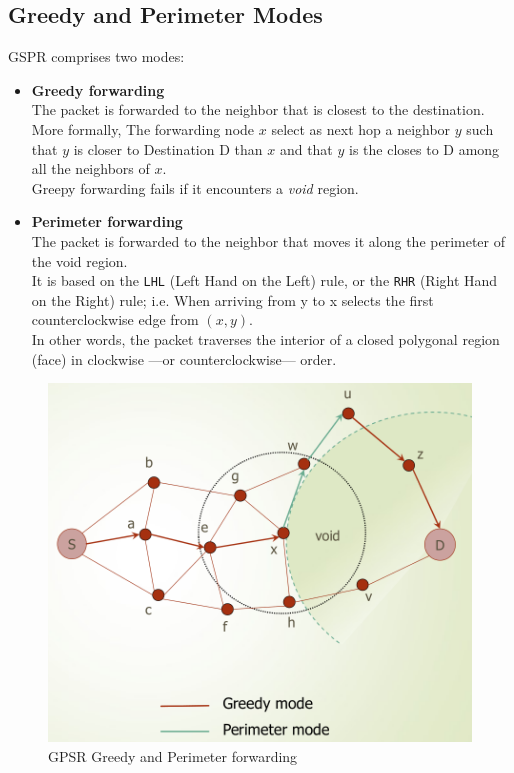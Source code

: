 \subsection{Greedy and Perimeter Modes}
\begin{paracol}{2}
   
   GSPR comprises two modes:
   \begin{itemize}
      \item \textbf{Greedy forwarding}\\
      The packet is forwarded to the neighbor that is closest to the destination.\\
      More formally,
      The forwarding node $x$ select as next hop a neighbor $y$ such that $y$ is closer to Destination D than $x$ and that $y$ is the closes to D among all the neighbors of $x$.\\
      Greepy forwarding fails if it encounters a \textit{void} region.
      \item \textbf{Perimeter forwarding}\\
      The packet is forwarded to the neighbor that moves it along the perimeter of the void region.\\
      It is based on the \texttt{LHL} (Left Hand on the Left) rule, or the \texttt{RHR} (Right Hand on the Right) rule; i.e. When arriving from y to x selects the first
      counterclockwise edge from $(x,y)$.\\
      In other words, the packet traverses the interior of a closed polygonal region (face) in clockwise ---or counterclockwise--- order.
   \end{itemize}
   \switchcolumn
   
   \colfill
   \begin{figure}[htbp]
      \centering
      \includegraphics{images/GPSR_modes.png}
      \caption{GPSR Greedy and Perimeter forwarding}
      \label{fig:GPSR_modes}
   \end{figure}
   \colfill

\end{paracol}


